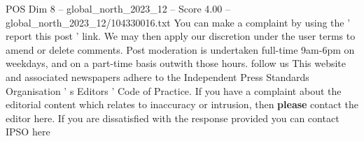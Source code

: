 \begin{textsample}{POS Dim 8 – global\_north\_2023\_12 – Score 4.00 – global\_north\_2023\_12/104330016.txt}
You can make a complaint by using the ' report this post ' link.
We may then apply our discretion under the user terms to amend or delete comments.
Post moderation is undertaken full-time 9am-6pm on weekdays, and on a part-time basis outwith those hours. follow us This website and associated newspapers adhere to the Independent Press Standards Organisation ' s Editors ' Code of Practice.
If you have a complaint about the editorial content which relates to inaccuracy or intrusion, then \textbf{please} contact the editor here.
If you are dissatisfied with the response provided you can contact IPSO here

\end{textsample}
